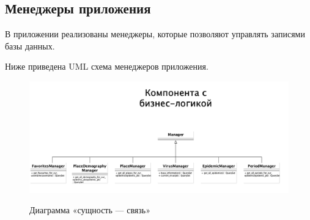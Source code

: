 \documentclass[a4paper,14pt]{extarticle}
\begin{document}
 	\newpage
 
 	\subsection{Менеджеры приложения}
 	
 	В приложении реализованы менеджеры, которые позволяют управлять записями базы данных.
 	
 	Ниже приведена UML схема менеджеров приложения.
 	
 	\begin{figure}[h!]
 		\begin{center}
 			{\includegraphics[width = \textwidth]{diagram/managers.png}}
 			\caption{
 				Диаграмма «сущность — связь»}
 			\label{ris:managersl}
 		\end{center}
 	\end{figure}
 	
\end{document}
